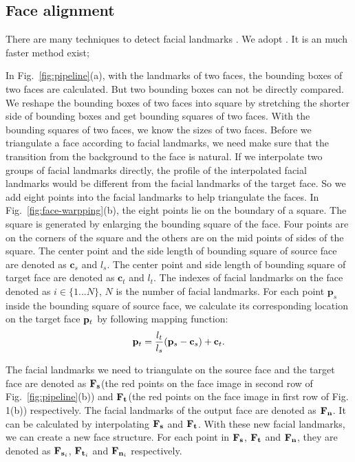 \subsection{Face alignment}


%
There are many techniques to detect facial landmarks \cite{fld2,fld3,fld4,fld}. We adopt \cite{fld}. It is an much faster method exist;

In Fig.~\ref{fig:pipeline}(a), with the landmarks of two faces, the bounding boxes of two faces are calculated. But two bounding boxes can not be directly compared.
We reshape the bounding boxes of two faces into square by stretching the shorter side of bounding boxes and get bounding squares of two faces.
With the bounding squares of two faces, we know the sizes of two faces.
%
%
Before we triangulate a face according to facial landmarks, we need make sure that the transition from the background to the face is natural. If we interpolate two groups of facial landmarks directly, the profile of the interpolated facial landmarks would be different from the facial landmarks of the target face.
%
So we add eight points into the facial landmarks to help triangulate the faces. In Fig.~\ref{fig:face-warpping}(b), the eight points lie on the boundary of a square. The square is generated by enlarging the bounding square of the face. Four points are on the corners of the square and the others are on the mid points of sides of the square.
%
The center point and the side length of bounding square of source face are denoted as $\mathbf{c}_s$ and $l_s$.
The center point and side length of bounding square of target face are denoted as $\mathbf{c}_t$ and $l_t$.
%
The indexes of facial landmarks on the face denoted as $i \in \{1...N\}$, $N$ is the number of facial landmarks.
For each point $\mathbf{p}_s$ inside the bounding square of source face, we calculate its corresponding location on the target face $\mathbf{p}_t$ by following mapping function:
%
\begin{equation}
\label{eq:trans-point}
\mathbf{p}_t=\frac{l_t}{l_s}(\mathbf{p}_s-\mathbf{c}_s) + \mathbf{c}_t.
\end{equation}

The facial landmarks we need to triangulate on the source face and the target face are denoted as $\mathbf{F_{s}}$(the red points on the face image in second row of Fig.~\ref{fig:pipeline}(b)) and $\mathbf{F_{t}}$(the red points on the face image in first row of Fig. 1(b)) respectively.
The facial landmarks of the output face are denoted as $\mathbf{F_n}$. It can be calculated by interpolating $\mathbf{F_s}$ and $\mathbf{F_t}$. With these new facial landmarks, we can create a new face structure. For each point in $\mathbf{F_s}$, $\mathbf{F_t}$ and $\mathbf{F_n}$, they are denoted as $\mathbf{F}_{\mathbf{s}_i}$, $\mathbf{F}_{\mathbf{t}_i}$ and $\mathbf{F}_{\mathbf{n}_i}$ respectively.

